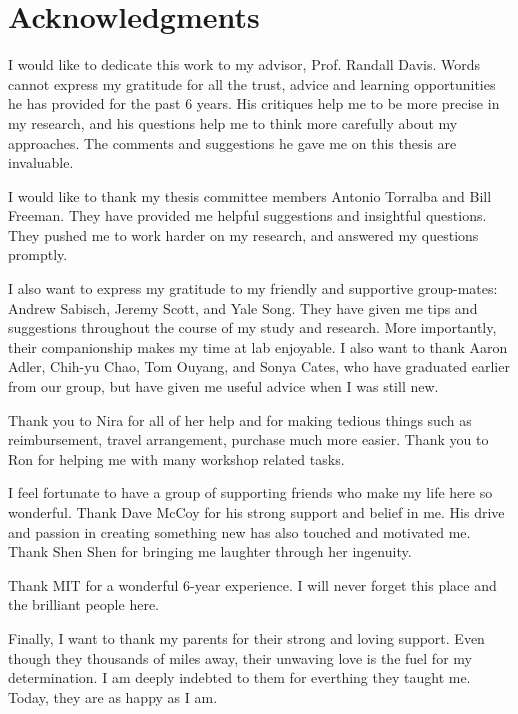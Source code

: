 % 

\cleardoublepage

\section*{Acknowledgments}

I would like to dedicate this work to my advisor, Prof. Randall Davis. Words
cannot express my gratitude for all the trust, advice and learning opportunities
he has provided for the past 6 years. His critiques help me to be more precise
in my research, and his questions help me to think more carefully about my
approaches. The comments and suggestions he gave me on this thesis are
invaluable.

I would like to thank my thesis committee members Antonio Torralba and Bill
Freeman. They have provided me helpful suggestions and insightful questions.
They pushed me to work harder on my research, and answered my questions
promptly.

I also want to express my gratitude to my friendly and supportive group-mates:
Andrew Sabisch, Jeremy Scott, and Yale Song. They have given me tips and
suggestions throughout the course of my study and research. More importantly,
their companionship makes my time at lab enjoyable. I also want
to thank Aaron Adler, Chih-yu Chao, Tom Ouyang, and Sonya Cates, who have
graduated earlier from our group, but have given me useful advice when I was
still new.

Thank you to Nira for all of her help and for making tedious things such as
reimbursement, travel arrangement, purchase much more easier. Thank you to Ron
for helping me with many workshop related tasks.

I feel fortunate to have a group of supporting friends who make my life here
so wonderful. Thank Dave McCoy for his strong support and belief in me. His
drive and passion in creating something new has also touched and motivated me.
Thank Shen Shen for bringing me laughter through her ingenuity. 

Thank MIT for a wonderful 6-year experience. I will never forget this place and
the brilliant people here.

Finally, I want to thank my parents for their
strong and loving support. Even though they thousands of miles away, their
unwaving love is the fuel for my determination. I am deeply indebted to them for
everthing they taught me. Today, they are as happy as I am.


